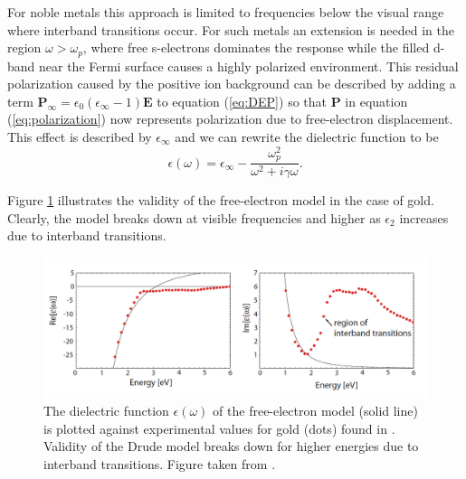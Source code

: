 For noble metals this approach is limited to frequencies below the visual range where interband transitions occur. For such metals an extension is needed in the region $\omega > \omega_p$, where free s-electrons dominates the response while the filled d-band near the Fermi surface causes a highly polarized environment. This residual polarization caused by the positive ion background can be described by adding a term $\mathbf{P_\infty}=\epsilon_0(\epsilon_\infty - 1)\mathbf{E}$ to equation (\ref{eq:DEP}) so that $\mathbf{P}$ in equation (\ref{eq:polarization}) now represents polarization due to free-electron displacement\cite{maier}. This effect is described by $\epsilon_\infty$ and we can rewrite the dielectric function to be
\begin{equation}
    \epsilon(\omega) = \epsilon_\infty-\frac{\omega_p^2}{\omega^2 + i\gamma \omega}.
    \label{eq:drude response2}
\end{equation}

Figure \ref{fig:DrudeGold} illustrates the validity of the free-electron model in the case of gold. Clearly, the model breaks down at visible frequencies and higher as $\epsilon_2$ increases due to interband transitions. 

\begin{figure}
    \centering
    \includegraphics[scale=0.3]{figures/Ch2/DrudeGold.png}
    \caption{The dielectric function $\epsilon(\omega)$ of the free-electron model (solid line) is plotted against experimental values for gold (dots) found in \cite{Johnson&Christy}. Validity of the Drude model breaks down for higher energies due to interband transitions. Figure taken from \cite{maier}.}
    \label{fig:DrudeGold}
\end{figure}

